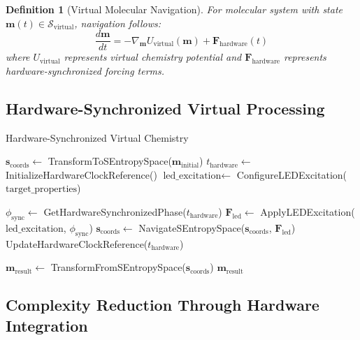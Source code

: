 \documentclass[12pt,a4paper]{article}
\newtheorem{definition}[theorem]{Definition}
\begin{document}
\begin{definition}[Virtual Molecular Navigation]
For molecular system with state $\mathbf{m}(t) \in \mathcal{S}_{\text{virtual}}$, navigation follows:
\begin{equation}
\frac{d\mathbf{m}}{dt} = -\nabla_{\mathbf{m}} U_{\text{virtual}}(\mathbf{m}) + \mathbf{F}_{\text{hardware}}(t)
\end{equation}
where $U_{\text{virtual}}$ represents virtual chemistry potential and $\mathbf{F}_{\text{hardware}}$ represents hardware-synchronized forcing terms.
\end{definition}

\subsection{Hardware-Synchronized Virtual Processing}

\begin{algorithm}[H]
\caption{Hardware-Synchronized Virtual Chemistry}
\begin{algorithmic}[1]
    \State $\mathbf{s}_{\text{coords}} \gets$ TransformToSEntropySpace($\mathbf{m}_{\text{initial}}$)
    \State $t_{\text{hardware}} \gets$ InitializeHardwareClockReference()
    \State $\text{led\_excitation} \gets$ ConfigureLEDExcitation($\text{target\_properties}$)

        \State $\phi_{\text{sync}} \gets$ GetHardwareSynchronizedPhase($t_{\text{hardware}}$)
        \State $\mathbf{F}_{\text{led}} \gets$ ApplyLEDExcitation($\text{led\_excitation}$, $\phi_{\text{sync}}$)
        \State $\mathbf{s}_{\text{coords}} \gets$ NavigateSEntropySpace($\mathbf{s}_{\text{coords}}$, $\mathbf{F}_{\text{led}}$)
        \State UpdateHardwareClockReference($t_{\text{hardware}}$)
    \EndWhile

    \State $\mathbf{m}_{\text{result}} \gets$ TransformFromSEntropySpace($\mathbf{s}_{\text{coords}}$)
    \State \Return $\mathbf{m}_{\text{result}}$
\EndProcedure
\end{algorithmic}
\end{algorithm}

\subsection{Complexity Reduction Through Hardware Integration}
\end{document}
